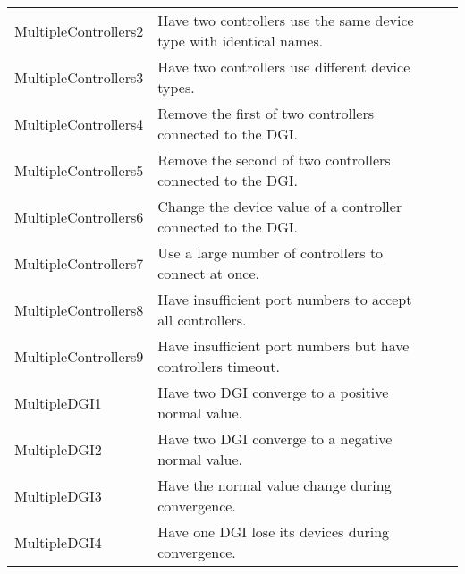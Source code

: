 \documentclass{article}
\begin{document}
\begin{center}
\begin{footnotesize}
\begin{longtable}{|p{3cm}|p{4cm}|p{10cm}|c|}
    MultipleControllers2 & Have two controllers use the same device type with identical names. & & \\
    MultipleControllers3 & Have two controllers use different device types. & & \\
    MultipleControllers4 & Remove the first of two controllers connected to the DGI. & & \\
    MultipleControllers5 & Remove the second of two controllers connected to the DGI. & & \\
    MultipleControllers6 & Change the device value of a controller connected to the DGI. & & \\
    MultipleControllers7 & Use a large number of controllers to connect at once. & & \\
    MultipleControllers8 & Have insufficient port numbers to accept all controllers. & & \\
    MultipleControllers9 & Have insufficient port numbers but have controllers timeout. & & \\
    MultipleDGI1 & Have two DGI converge to a positive normal value. & & \\
    MultipleDGI2 & Have two DGI converge to a negative normal value. & & \\
    MultipleDGI3 & Have the normal value change during convergence. & & \\
    MultipleDGI4 & Have one DGI lose its devices during convergence. & & \\
\end{longtable}
\end{footnotesize}
\end{center}
\end{document}
